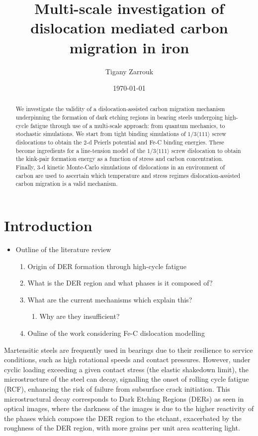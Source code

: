 \documentclass[a4paper]{article}
\author{Tigany Zarrouk}
\date{\today}
\title{Multi-scale investigation of dislocation mediated carbon migration in iron}
\begin{document}
\maketitle
\tableofcontents

\begin{abstract}

We investigate the validity of a dislocation-assisted carbon migration
mechanism underpinning the formation of dark etching regions in
bearing steels undergoing high-cycle fatigue through use of a
multi-scale approach: from quantum mechanics,
to stochastic simulations. We start from tight binding simulations of
$1/3\langle 111 \rangle$ screw dislocations to obtain the 2-d Peierls
potential and Fe-C binding energies. These become ingredients for a line-tension
model of the $1/3\langle 111 \rangle$ screw dislocation to obtain the kink-pair formation
energy as a function of stress and carbon concentration. Finally,
3-d kinetic Monte-Carlo simulations of dislocations in an environment
of carbon are used to ascertain which temperature and stress regimes
dislocation-assisted carbon migration is a valid mechanism. 

\end{abstract}


\section{Introduction}
\label{sec:orge0fde6e}

\begin{itemize}
\item Outline of the literature review 
\begin{enumerate}
\item Origin of DER formation through high-cycle fatigue
\item What is the DER region and what phases is it composed of?
\item What are the current mechanisms which explain this?
\begin{enumerate}
\item Why are they insufficient?
\end{enumerate}
\item Ouline of the work considering Fe-C dislocation modelling
\end{enumerate}
\end{itemize}


Martensitic steels are frequently used in bearings due to their
resilience to service conditions, such as high rotational speeds and
contact pressures. However, under cyclic loading exceeding a given
contact stress (the elastic shakedown limit), the microstructure of
the steel can decay, signalling the onset of rolling cycle fatigue
(RCF), enhancing the risk of failure from subsurface crack
initiation. This microstructural decay corresponds to Dark Etching
Regions (DERs) as seen in optical images, where the darkness of the images
is due to the higher reactivity of the phases which compose the DER
region to the etchant, exacerbated by the roughness of the DER
region, with more grains per unit
area scattering light.
\end{document}
